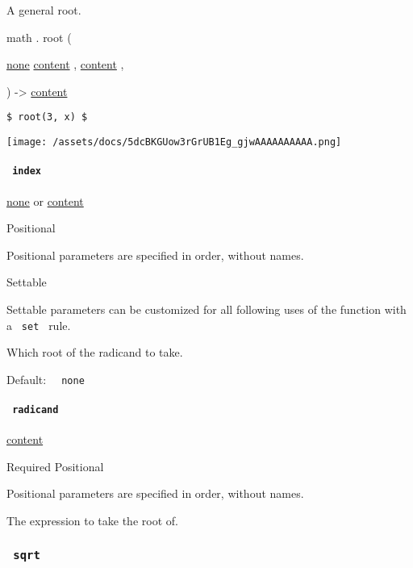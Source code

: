 A general root.

math { . } { root } (

{ \hyperref[functions-root-parameters-index]{}
\href{/docs/reference/foundations/none/}{none}
\href{/docs/reference/foundations/content/}{content} , } {
\href{/docs/reference/foundations/content/}{content} , }

) -\textgreater{} \href{/docs/reference/foundations/content/}{content}

\begin{verbatim}
$ root(3, x) $
\end{verbatim}

\texttt{[image: /assets/docs/5dcBKGUow3rGrUB1Eg\_gjwAAAAAAAAAA.png]}

\paragraph{\texorpdfstring{\texttt{\ index\ }}{ index }}\label{functions-root-index}

\href{/docs/reference/foundations/none/}{none} {or}
\href{/docs/reference/foundations/content/}{content}

{{ Positional }}

\label{functions-root-index-positional-tooltip}
Positional parameters are specified in order, without names.

{{ Settable }}

\label{functions-root-index-settable-tooltip}
Settable parameters can be customized for all following uses of the
function with a \texttt{\ set\ } rule.

Which root of the radicand to take.

Default: \texttt{\ }{\texttt{\ none\ }}\texttt{\ }

\paragraph{\texorpdfstring{\texttt{\ radicand\ }}{ radicand }}\label{functions-root-radicand}

\href{/docs/reference/foundations/content/}{content}

{Required} {{ Positional }}

\label{functions-root-radicand-positional-tooltip}
Positional parameters are specified in order, without names.

The expression to take the root of.

\subsubsection{\texorpdfstring{\texttt{\ sqrt\ }}{ sqrt }}\label{functions-sqrt}

